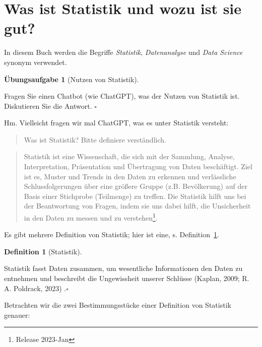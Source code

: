 \documentclass[
  a4paper,
]{scrbook}
\theoremstyle{definition}
\theoremstyle{definition}
\newtheorem{definition}{Definition}[chapter]
\theoremstyle{definition}
\newtheorem{exercise}{Übungsaufgabe}[chapter]
\theoremstyle{remark}
\begin{document}
\section{Was ist Statistik und wozu ist sie
gut?}\label{was-ist-statistik-und-wozu-ist-sie-gut}

In diesem Buch werden die Begriffe \emph{Statistik}, \emph{Datenanalyse}
und \emph{Data Science} synonym verwendet.

\begin{exercise}[Nutzen von
Statistik]\protect\hypertarget{exr-nutzen-statistik}{}\label{exr-nutzen-statistik}

Fragen Sie einen Chatbot (wie ChatGPT), was der Nutzen von Statistik
ist. Diskutieren Sie die Antwort. \(\square\)

\end{exercise}

Hm. Vielleicht fragen wir mal ChatGPT, was es unter Statistik versteht:

\begin{quote}
{} Was ist Statistik? Bitte definiere verständlich.
\end{quote}

\begin{quote}
{} Statistik ist eine Wissenschaft, die sich mit der
Sammlung, Analyse, Interpretation, Präsentation und Übertragung von
Daten beschäftigt. Ziel ist es, Muster und Trends in den Daten zu
erkennen und verlässliche Schlussfolgerungen über eine größere Gruppe
(z.B. Bevölkerung) auf der Basis einer Stichprobe (Teilmenge) zu
treffen. Die Statistik hilft uns bei der Beantwortung von Fragen, indem
sie uns dabei hilft, die Unsicherheit in den Daten zu messen und zu
verstehen\footnote{Release 2023-Jan}.
\end{quote}

Es gibt mehrere Definition von Statistik; hier ist eine, s.
Definition~\ref{def-statistik}.

\begin{definition}[Statistik]\protect\hypertarget{def-statistik}{}\label{def-statistik}

Statistik fasst Daten zusammen, um wesentliche Informationen den Daten
zu entnehmen und beschreibt die Ungewissheit unserer Schlüsse (Kaplan,
2009; R. A. Poldrack, 2023) .\(\square\)

\end{definition}

Betrachten wir die zwei Bestimmungsstücke einer Definition von Statistik
genauer:
\end{document}
